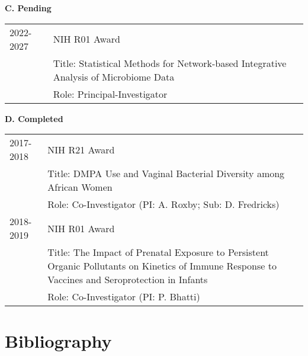\documentclass[10pt]{article}
\begin{document}
\textbf{C. Pending}

\begin{table}[H]
\hskip0.9cm\begin{tabular}{p{1.6cm}p{12cm}}
2022-2027 & NIH R01 Award \\
& Title: Statistical Methods for Network-based Integrative Analysis of Microbiome Data \\
& Role: Principal-Investigator
\end{tabular}
\end{table}
%


 \textbf{D. Completed}
\begin{table}[H]
\hskip0.9cm\begin{tabular}{p{1.6cm}p{12cm}}
2017-2018 & NIH R21 Award\\
&		Title: DMPA Use and Vaginal Bacterial Diversity among African Women\\
&		Role: Co-Investigator (PI: A. Roxby; Sub: D. Fredricks)\\
2018-2019 & NIH R01 Award\\
&	Title: The Impact of Prenatal Exposure to Persistent Organic Pollutants on Kinetics of Immune Response to Vaccines and Seroprotection in Infants\\
& Role: Co-Investigator (PI: P. Bhatti) 
\end{tabular}
\end{table}

\section{Bibliography}
\end{document}
